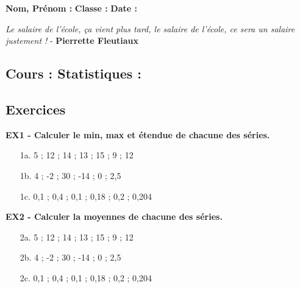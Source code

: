 



\textbf{Nom, Prénom :} \hspace{8cm} \textbf{Classe :} \hspace{3cm} \textbf{Date :}\\

\begin{center}
  \textit{Le salaire de l’école, ça vient plus tard, le salaire de l’école, ce sera un salaire justement !}  - \textbf{Pierrette Fleutiaux}
\end{center}

\subsection*{Cours : Statistiques :}

\Pointilles[5]

\subsection*{Exercices}

\textbf{EX1 - Calculer le min, max et étendue de chacune des séries.}

\begin{multicols}{3}

\begin{enumerate}
  \item[1a.] 5 ; 12 ; 14 ; 13 ; 15 ; 9 ; 12  \\ \Pointilles[5]
  \item[1b.] 4 ; -2  ; 30 ; -14 ; 0 ; 2,5 \\ \Pointilles[5]
  \item[1c.] 0,1 ; 0,4 ; 0,1 ; 0,18 ; 0,2 ; 0,204\\ \Pointilles[5]
\end{enumerate}

\end{multicols}

\textbf{EX2 - Calculer la moyennes de chacune des séries.}

\begin{multicols}{3}

  \begin{enumerate}
  \item[2a.] 5 ; 12 ; 14 ; 13 ; 15 ; 9 ; 12  \\ \Pointilles[3]
  \item[2b.] 4 ; -2  ; 30 ; -14 ; 0 ; 2,5 \\ \Pointilles[3]
  \item[2c.] 0,1 ; 0,4 ; 0,1 ; 0,18 ; 0,2 ; 0,204\\ \Pointilles[3]
\end{enumerate}

\end{multicols}

